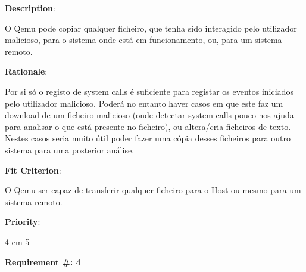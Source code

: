 \begin{description}
\item \textbf{Description}:

O Qemu pode copiar qualquer ficheiro, que tenha sido interagido pelo utilizador malicioso, para o sistema onde está em funcionamento, 
ou, para um sistema remoto.

\item \textbf{Rationale}:

Por si só o registo de system calls é suficiente para registar os eventos iniciados pelo utilizador malicioso. Poderá no entanto haver casos
em que este faz um download de um ficheiro malicioso (onde detectar system calls pouco nos ajuda para analisar o que está presente no ficheiro), ou 
altera/cria ficheiros de texto. Nestes casos seria muito útil poder fazer uma cópia desses ficheiros para outro sistema para uma posterior análise.

\item \textbf{Fit Criterion}:

O Qemu ser capaz de transferir qualquer ficheiro para o Host ou mesmo para um sistema remoto.

\item \textbf{Priority}:

4 em 5

\end{description}

\pagebreak







\begin{minipage}{0.55\textwidth}
\begin{flushleft}\textbf{Requirement \#: 4}\end{flushleft}
\end{minipage}
\begin{minipage}{0.4\textwidth}
\end{minipage}

